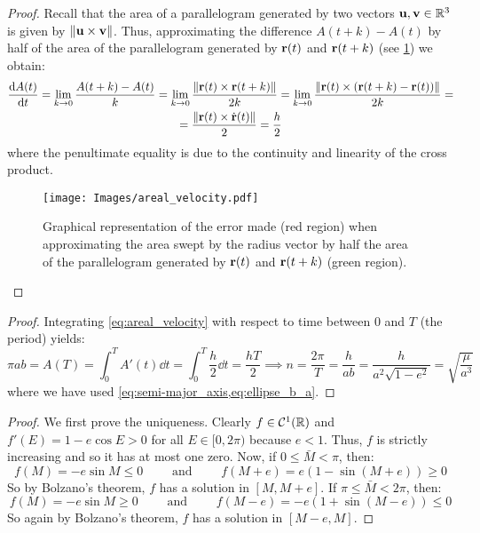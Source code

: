 \documentclass[../main.tex]{subfiles}
\begin{document}
\keplerB*
\begin{proof}
  Recall that the area of a parallelogram generated by two vectors $\boldsymbol{\mathrm{u}},\boldsymbol{\mathrm{v}}\in\mathbb{R}^3$ is given by $\left\|\boldsymbol{\mathrm{u}}\times\boldsymbol{\mathrm{v}}\right\|$. Thus, approximating the difference $A(t+k)-A(t)$ by half of the area of the parallelogram generated by $\boldsymbol{\mathrm{r}}(t)$ and ${\boldsymbol{\mathrm{r}}}(t+k)$ (see \cref{fig:areal_vel}) we obtain:
  \begin{multline}
    \dv{A(t)}{t}=\lim_{k\to 0}\frac{A(t+k)-A(t)}{k}=\lim_{k\to 0}\frac{\left\|\boldsymbol{\mathrm{r}}(t)\times\boldsymbol{\mathrm{r}}(t+k)\right\|}{2k}=\lim_{k\to 0}\frac{\left\|\boldsymbol{\mathrm{r}}(t)\times(\boldsymbol{\mathrm{r}}(t+k)-\boldsymbol{\mathrm{r}}(t))\right\|}{2k}=\\
    =\frac{\left\|\boldsymbol{\mathrm{r}}(t)\times\dot{\boldsymbol{\mathrm{r}}}(t)\right\|}{2}=\frac{h}{2}
  \end{multline}
  where the penultimate equality is due to the continuity and linearity of the cross product.
  \begin{figure}[htbp]
    \centering
    \texttt{[image: Images/areal\_velocity.pdf]}
    \caption{Graphical representation of the error made (red region) when approximating the area swept by the radius vector by half the area of the parallelogram generated by $\boldsymbol{\mathrm{r}}(t)$ and $\boldsymbol{\mathrm{r}}(t+k)$ (green region).}
    \label{fig:areal_vel}
  \end{figure}
\end{proof}
\keplerC*
\begin{proof}
  Integrating \cref{eq:areal_velocity} with respect to time between 0 and $T$ (the period) yields:
  \begin{equation}
    \pi a b=A(T)=\int_0^T A'(t)\dd{t}=\int_0^T \frac{h}{2}\dd{t}=\frac{hT}{2}\implies n=\frac{2\pi}{T}=\frac{h}{a b}=\frac{h}{a^2\sqrt{1-e^2}}=\sqrt{\frac{\mu}{a^3}}
  \end{equation}
  where we have used \cref{eq:semi-major_axis,eq:ellipse_b_a}.
\end{proof}
\keplerequation*
\begin{proof}
  We first prove the uniqueness. Clearly $f\in\mathcal{C}^1(\mathbb{R})$ and $f'(E)=1-e\cos E> 0$ for all $E\in[0,2\pi)$ because $e<1$. Thus, $f$ is strictly increasing and so it has at most one zero. Now, if $0\leq \bar{M}< \pi$, then:
  \begin{equation}
    f(M)=-e\sin M\leq 0\qquad\text{ and }\qquad f(M+e)=e(1-\sin (M+e))\geq 0
  \end{equation}
  So by Bolzano's theorem, $f$ has a solution in $[M,M+e]$. If $\pi\leq \bar{M}< 2\pi$, then:
  \begin{equation}
    f(M)=-e\sin M\geq 0\qquad\text{ and }\qquad f(M-e)=-e(1+\sin (M-e))\leq 0
  \end{equation}
  So again by Bolzano's theorem, $f$ has a solution in $[M-e,M]$.
\end{proof}
\end{document}

